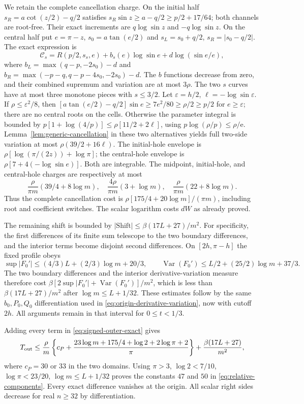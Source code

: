 We retain the complete cancellation charge. On the initial half
$s_R=a\cot(z/2)-q/2$ satisfies
$s_R\sin z\geq a-q/2\geq p/2+17/64$; both channels are root-free.
Their exact increments are $q\log\sin z$ and $-q\log\sin z$.
On the central half put $e=\pi-z$, $s_0=a\tan(e/2)$ and
$s_L=s_0+q/2$, $s_R=|s_0-q/2|$. The exact expression is
\[
 \mathcal C_s=R(p/2,s_s,e)+b_s(e)\log\sin e+d\log(\sin e/e),
\]
where $b_L=\max(q-p,-2s_0)-d$ and
$b_R=\max(-p-q,q-p-4s_0,-2s_0)-d$.
The $b$ functions decrease from zero, and their combined supremum and
variation are at most $3\rho$. The two $s$ curves have at most three
monotone pieces with $s\leq3/2$.
Let $\varepsilon=h/2$, $\ell=-\log\sin\varepsilon$.
If $\rho\leq\varepsilon^2/8$, then
$[a\tan(e/2)-q/2]\sin e\geq7e^2/80\geq\rho/2\geq p/2$
for $e\geq\varepsilon$; there are no central roots on the cells.
Otherwise the parameter integral is bounded by
$p[1+\log(4/p)]\leq\rho[11/2+2\ell]$,
using $p\log(\rho/p)\leq\rho/\mathrm e$.
Lemma~\ref{lem:generic-cancellation} in these two alternatives yields
full two-side variation at most $\rho(39/2+16\ell)$.
The initial-hole envelope is
$\rho[\log(\pi/(2z))+\log\pi]$; the central-hole envelope is
$\rho[7+4(-\log\sin e)]$. Both are integrable. The midpoint,
initial-hole, and central-hole charges are respectively at most
\[
 \frac\rho{\pi m}(39/4+8\log m),\quad
 \frac{4\rho}{\pi m}(3+\log m),\quad
 \frac\rho{\pi m}(22+8\log m).
\]
Thus the complete cancellation cost is
$\rho[175/4+20\log m]/(\pi m)$, including root and coefficient
switches. The scalar logarithm costs $dW$ as already proved.

The remaining shift is bounded by
$|\mathrm{Shift}|\leq\beta(17L+27)/m^2$.
For specificity, the first differences of its finite sum telescope
to the two boundary differences, and the interior terms become
disjoint second differences. On $[2h,\pi-h]$ the fixed profile obeys
\[
 \sup|F_0'|\leq(4/3)L+(2/3)\log m+20/3,\qquad
 \operatorname{Var}(F_0')\leq L/2+(25/2)\log m+37/3.
\]
The two boundary differences and the interior derivative-variation
measure therefore cost
$\beta[2\sup|F_0'|+\operatorname{Var}(F_0')]/m^2$,
which is less than $\beta(17L+27)/m^2$ after
$\log m\leq L+1/32$. These estimates follow by the same
$b_0,P_0,Q_0$ differentiation used in
\eqref{eq:origin-derivative-variation}, now with cutoff $2h$.
All arguments remain in that interval for $0\leq t<1/3$.

Adding every term in \eqref{eq:signed-outer-exact} gives
\[
 T_{\rm out}\leq\frac\rho m
 \left\{c_P+\frac{23\log m+175/4+\log2+2\log\pi+2}\pi\right\}
       +\frac{\beta(17L+27)}{m^2},
\]
where $c_P=30$ or $33$ in the two domains. Using $\pi>3$,
$\log2<7/10$, $\log\pi<23/20$, $\log m\leq L+1/32$ proves
the constants $47$ and $50$ in \eqref{eq:relative-components}.
Every exact difference vanishes at the origin. All scalar right sides
decrease for real $n\geq32$ by differentiation.

